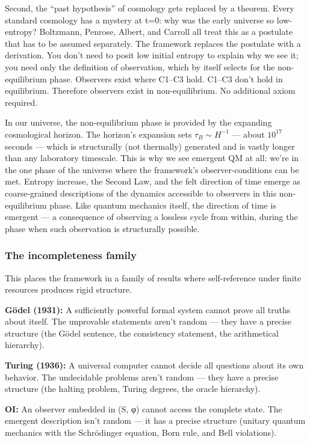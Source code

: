 \documentclass[
]{article}
\begin{document}
Second, the ``past hypothesis'' of cosmology gets replaced by a theorem.
Every standard cosmology has a mystery at t=0: why was the early
universe so low-entropy? Boltzmann, Penrose, Albert, and Carroll all
treat this as a postulate that has to be assumed separately. The
framework replaces the postulate with a derivation. You don't need to
posit low initial entropy to explain why we see it; you need only the
definition of observation, which by itself selects for the
non-equilibrium phase. Observers exist where C1--C3 hold. C1--C3 don't
hold in equilibrium. Therefore observers exist in non-equilibrium. No
additional axiom required.

In our universe, the non-equilibrium phase is provided by the expanding
cosmological horizon. The horizon's expansion sets
\(\tau_B \sim H^{-1}\) --- about \(10^{17}\) seconds --- which is
structurally (not thermally) generated and is vastly longer than any
laboratory timescale. This is why we see emergent QM at all: we're in
the one phase of the universe where the framework's observer-conditions
can be met. Entropy increase, the Second Law, and the felt direction of
time emerge as coarse-grained descriptions of the dynamics accessible to
observers in this non-equilibrium phase. Like quantum mechanics itself,
the direction of time is emergent --- a consequence of observing a
lossless cycle from within, during the phase when such observation is
structurally possible.

\hypertarget{the-incompleteness-family}{%
\subsubsection{The incompleteness
family}\label{the-incompleteness-family}}

This places the framework in a family of results where self-reference
under finite resources produces rigid structure.

\textbf{Gödel (1931):} A sufficiently powerful formal system cannot
prove all truths about itself. The unprovable statements aren't random
--- they have a precise structure (the Gödel sentence, the consistency
statement, the arithmetical hierarchy).

\textbf{Turing (1936):} A universal computer cannot decide all questions
about its own behavior. The undecidable problems aren't random --- they
have a precise structure (the halting problem, Turing degrees, the
oracle hierarchy).

\textbf{OI:} An observer embedded in (S, φ) cannot access the complete
state. The emergent description isn't random --- it has a precise
structure (unitary quantum mechanics with the Schrödinger equation, Born
rule, and Bell violations).
\end{document}
